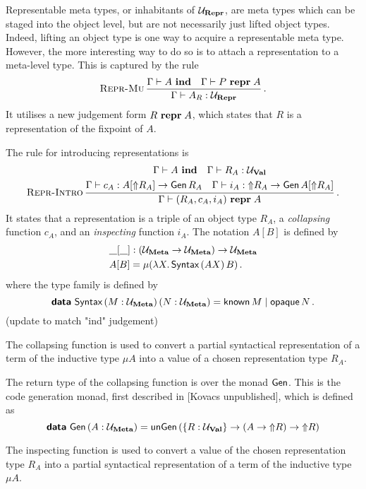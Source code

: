 Representable meta types, or inhabitants of $\Ur$, are meta types which can be
staged into the object level, but are not necessarily just lifted object types.
Indeed, lifting an object type is one way to acquire a representable meta type.
However, the more interesting way to do so is to attach a representation to a
meta-level type. This is captured by the rule
\[
  \infrule[Repr-Mu]{\Gamma \vdash \isind{A} \quad \Gamma \vdash \isrepr{P}{A}}
  {\Gamma \vdash A_R : \Ur} \,.
\]
It utilises a new judgement form $\isrepr{R}{A}$, which states that $R$ is a
representation of the fixpoint of $A$.

The rule for introducing representations is
\[
  \infrule[Repr-Intro]{
    \begin{gathered}
      \Gamma \vdash \isind{A} \quad
      \Gamma \vdash R_A : \Uv                                \\
      \Gamma \vdash c_A : A [\lift{R_A}] \to \Gen \, R_A \quad
      \Gamma \vdash i_A : \lift{R_A} \to \Gen \, A [\lift{R_A}]
    \end{gathered}
  }{\Gamma \vdash \isrepr{(R_A, c_A, i_A)}{A}} \,.
\]
It states that a representation is a triple of an object type $R_A$, a
\emph{collapsing} function $c_A$, and an \emph{inspecting} function $i_A$. The
notation $A[B]$ is defined by
\begin{align*}
   & \wildp[\wildp] : (\Um \to \Um) \to \Um                                 \\
   & A[B] =           \mu (\lambda X . \, \defin{Syntax} \, (A X) \, B) \,.
\end{align*}
where the  type family is defined by
\[
  \data{Syntax} \,(M : \Um)\,(N : \Um) = \defin{known} \, M \mid \defin{opaque} \, N \,.
\]
(update to match "ind" judgement)

The collapsing function is used to convert a partial syntactical representation
of a term of the inductive type $\mu A$ into a value of a chosen representation
type $R_A$.

The return type of the collapsing function is over the monad $\Gen$. This is
the code generation monad, first described in [Kovacs unpublished], which is
defined as
\[
  \data{Gen} \, (A : \Um) = \defin{unGen} \, (\{ R : \Uv \} \to (A \to \lift R) \to \lift R)
\]

The inspecting function is used to convert a value of the chosen representation
type $R_A$ into a partial syntactical representation of a term of the inductive
type $\mu A$.

